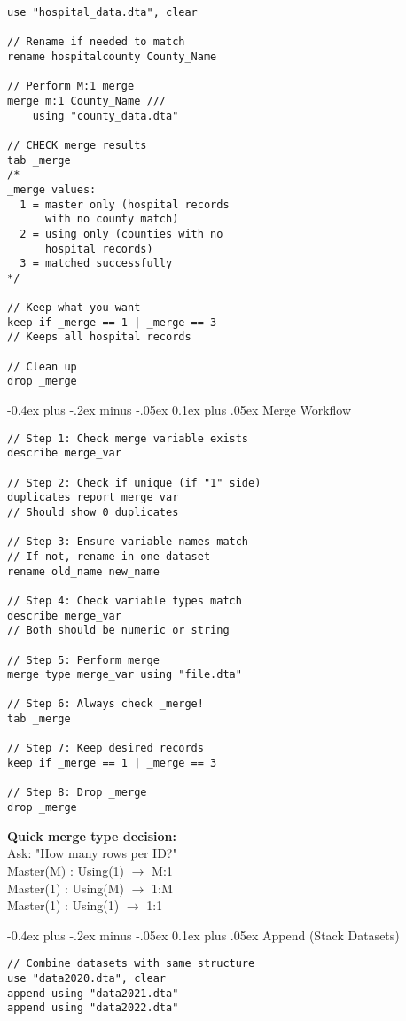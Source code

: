 \documentclass[8pt,letterpaper]{article}
\makeatletter
\renewcommand{\subsection}{\@startsection{subsection}{2}{0mm}%
                                {-0.4ex plus -.2ex minus -.05ex}%
                                {0.1ex plus .05ex}%
                                {\normalfont\fontsize{7.5pt}{7.5pt}\selectfont\bfseries\color{myblue}}}
\makeatother
\begin{document}
\begin{multicols}{2}
\begin{lstlisting}
use "hospital_data.dta", clear

// Rename if needed to match
rename hospitalcounty County_Name

// Perform M:1 merge
merge m:1 County_Name ///
    using "county_data.dta"

// CHECK merge results
tab _merge
/*
_merge values:
  1 = master only (hospital records
      with no county match)
  2 = using only (counties with no
      hospital records)
  3 = matched successfully
*/

// Keep what you want
keep if _merge == 1 | _merge == 3
// Keeps all hospital records

// Clean up
drop _merge
\end{lstlisting}

\subsection{Merge Workflow}
\begin{lstlisting}
// Step 1: Check merge variable exists
describe merge_var

// Step 2: Check if unique (if "1" side)
duplicates report merge_var
// Should show 0 duplicates

// Step 3: Ensure variable names match
// If not, rename in one dataset
rename old_name new_name

// Step 4: Check variable types match
describe merge_var
// Both should be numeric or string

// Step 5: Perform merge
merge type merge_var using "file.dta"

// Step 6: Always check _merge!
tab _merge

// Step 7: Keep desired records
keep if _merge == 1 | _merge == 3

// Step 8: Drop _merge
drop _merge
\end{lstlisting}

\begin{tipbox}
\textbf{Quick merge type decision:}\\
Ask: "How many rows per ID?"\\
Master(M) : Using(1) $\rightarrow$ M:1\\
Master(1) : Using(M) $\rightarrow$ 1:M\\
Master(1) : Using(1) $\rightarrow$ 1:1
\end{tipbox}

\subsection{Append (Stack Datasets)}
\begin{lstlisting}
// Combine datasets with same structure
use "data2020.dta", clear
append using "data2021.dta"
append using "data2022.dta"


\end{lstlisting}
\end{multicols}
\end{document}

